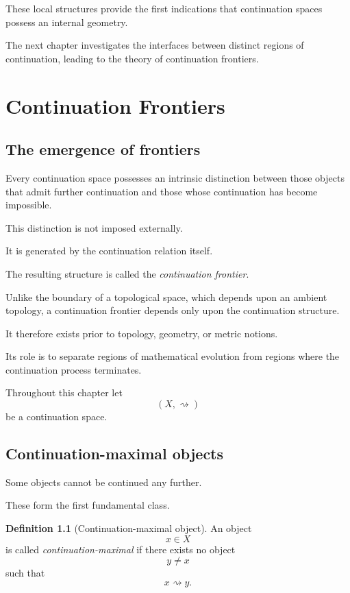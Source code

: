 \documentclass[13pt,openany]{book}
\theoremstyle{plain}
\theoremstyle{definition}
\newtheorem{definition}{Definition}[chapter]
\begin{document}
These local structures provide the first indications that continuation spaces
possess an internal geometry.

The next chapter investigates the interfaces between distinct regions of
continuation, leading to the theory of continuation frontiers.

\chapter{Continuation Frontiers}

\section{The emergence of frontiers}

Every continuation space possesses an intrinsic distinction between those
objects that admit further continuation and those whose continuation has
become impossible.

This distinction is not imposed externally.

It is generated by the continuation relation itself.

The resulting structure is called the \emph{continuation frontier}.

Unlike the boundary of a topological space, which depends upon an ambient
topology, a continuation frontier depends only upon the continuation
structure.

It therefore exists prior to topology, geometry, or metric notions.

Its role is to separate regions of mathematical evolution from regions where
the continuation process terminates.

Throughout this chapter let
\[
(X,\rightsquigarrow)
\]
be a continuation space.


\section{Continuation-maximal objects}

Some objects cannot be continued any further.

These form the first fundamental class.

\begin{definition}[Continuation-maximal object]
An object
\[
x\in X
\]
is called \emph{continuation-maximal} if there exists no object
\[
y\neq x
\]
such that
\[
x\rightsquigarrow y.
\]
\end{definition}
\end{document}
